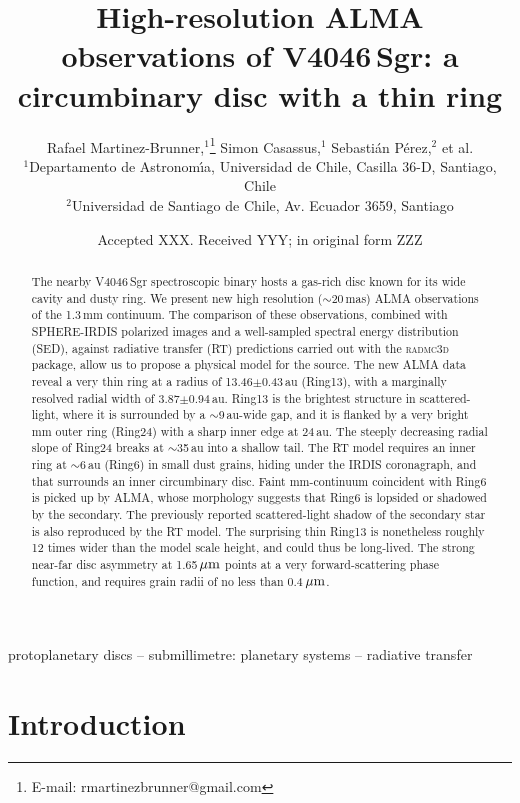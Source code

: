 \documentclass[letters,usenatbib,times]{mnras}
\title[High-resolution ALMA observations of V4046\,Sgr]{High-resolution ALMA observations of V4046\,Sgr: a circumbinary disc with a thin ring}
\author[R. Martinez Brunner et al.]{
Rafael Martinez-Brunner,$^{1}$\thanks{E-mail: rmartinezbrunner@gmail.com}
Simon Casassus,$^{1}$
Sebasti\'an P\'erez,$^{2}$
et al. 
\\
$^{1}$Departamento de Astronom\'{\i}a, Universidad de Chile, Casilla 36-D, Santiago, Chile\\
$^{2}$Universidad de Santiago de Chile, Av. Ecuador 3659, Santiago\\
}
\date{Accepted XXX. Received YYY; in original form ZZZ}
\begin{document}
\label{firstpage}
\pagerange{\pageref{firstpage}--\pageref{lastpage}}
\maketitle

\begin{abstract}
  The nearby V4046\,Sgr spectroscopic binary hosts a gas-rich disc known for its wide cavity and dusty ring. We present new high resolution ($\sim$20\,mas) ALMA observations of the 1.3\,mm continuum. The comparison of these observations, combined with SPHERE-IRDIS polarized images and a well-sampled spectral energy distribution (SED), against radiative transfer (RT) predictions carried out with the \textsc{radmc3d} package, allow us to propose a physical model for the source. The new ALMA data reveal a very thin ring at a radius of 13.46$\pm$0.43\,au (Ring13), with a marginally resolved radial width of 3.87$\pm$0.94\,au. Ring13 is the brightest structure in scattered-light, where it is surrounded by a $\sim$9\,au-wide gap, and it is flanked by a very bright mm outer ring (Ring24) with a sharp inner edge at 24\,au. The steeply decreasing radial slope of Ring24 breaks at $\sim$35\,au into a shallow tail. The RT model requires an inner ring at $\sim$6\,au (Ring6) in small dust grains, hiding under the IRDIS coronagraph, and that surrounds an inner circumbinary disc. Faint mm-continuum coincident with Ring6 is picked up by ALMA, whose morphology suggests that Ring6 is lopsided or shadowed by the secondary. The previously reported scattered-light shadow of the secondary star is also reproduced by the RT model. The surprising thin Ring13 is nonetheless roughly 12 times wider than the model scale height, and could thus be long-lived. The strong near-far disc asymmetry at 1.65\,$\hbox{$\mu$m}$ points at a very forward-scattering phase function, and requires grain radii of no less than 0.4\,$\hbox{$\mu$m}$. 
\end{abstract}

\begin{keywords}
 protoplanetary discs -- submillimetre: planetary systems -- radiative transfer
\end{keywords}



\section{Introduction} \label{sec:Introduction}
\end{document}
